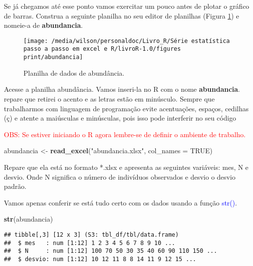 \documentclass[14pt,titlepage, oneside, openany, a4paper]{book}
\newenvironment{Shaded}{\begin{snugshade}}{\end{snugshade}}
\newcommand{\DataTypeTok}[1]{\textcolor[rgb]{0.13,0.29,0.53}{#1}}
\newcommand{\KeywordTok}[1]{\textcolor[rgb]{0.13,0.29,0.53}{\textbf{#1}}}
\newcommand{\NormalTok}[1]{#1}
\newcommand{\OtherTok}[1]{\textcolor[rgb]{0.56,0.35,0.01}{#1}}
\newcommand{\StringTok}[1]{\textcolor[rgb]{0.31,0.60,0.02}{#1}}
\begin{document}
Se já chegamos até esse ponto vamos exercitar um pouco antes de plotar o gráfico de barras. Construa a seguinte planilha no seu editor de planilhas (Figura \ref{fig:abundancia}) e nomeie-a de \textbf{abundancia}.

\begin{figure}[H]

{\centering \texttt{[image: /media/wilson/personaldoc/Livro\_R/Série estatística passo a passo em excel e R/livroR-1.0/figures print/abundancia]} 

}

\caption{Planilha de dados de abundância.}\label{fig:abundancia}
\end{figure}

Acesse a planilha abundância. Vamos inseri-la no R com o nome \textbf{abundancia}. repare que retirei o acento e as letras estão em minúsculo. Sempre que trabalharmos com linguagem de programação evite acentuações, espaços, cedilhas (ç) e atente a maiúsculas e minúsculas, pois isso pode interferir no seu código

\textcolor{red}{OBS: Se estiver iniciando o R agora lembre-se de definir o ambiente de trabalho.}

\begin{Shaded}
\begin{Highlighting}[]
\NormalTok{abundancia <-}\StringTok{ }\KeywordTok{read_excel}\NormalTok{(}\StringTok{"abundancia.xlsx"}\NormalTok{, }\DataTypeTok{col_names =} \OtherTok{TRUE}\NormalTok{)}
\end{Highlighting}
\end{Shaded}

Repare que ela está no formato *.xlsx e apresenta as seguintes variáveis: mes, N e desvio. Onde N significa o número de indivíduos observados e desvio o desvio padrão.

Vamos apenas conferir se está tudo certo com os dados usando a função \textcolor{blue}{str()}.

\begin{Shaded}
\begin{Highlighting}[]
\KeywordTok{str}\NormalTok{(abundancia)}
\end{Highlighting}
\end{Shaded}

\begin{verbatim}
## tibble[,3] [12 x 3] (S3: tbl_df/tbl/data.frame)
##  $ mes   : num [1:12] 1 2 3 4 5 6 7 8 9 10 ...
##  $ N     : num [1:12] 100 70 50 30 35 40 60 90 110 150 ...
##  $ desvio: num [1:12] 10 12 11 8 8 14 11 9 12 15 ...
\end{verbatim}
\end{document}

